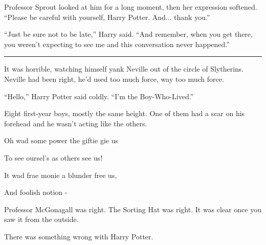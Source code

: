 Professor Sprout looked at him for a long moment, then her expression softened. ``Please be careful with yourself, Harry Potter. And... thank you.''

``Just be sure not to be late,'' Harry said. ``And remember, when you get there, you weren't expecting to see me and this conversation never happened.''

\begin{center}\rule{3in}{0.4pt}\end{center}

It was horrible, watching himself yank Neville out of the circle of Slytherins. Neville had been right, he'd used too much force, way too much force.

``Hello,'' Harry Potter said coldly. ``I'm the Boy-Who-Lived.''

Eight first-year boys, mostly the same height. One of them had a scar on his forehead and he wasn't acting like the others.

Oh wad some power the giftie gie us

To see oursel's as others see us!

It wad frae monie a blunder free us,

And foolish notion -

Professor McGonagall was right. The Sorting Hat was right. It was clear once you saw it from the outside.

There was something wrong with Harry Potter.
